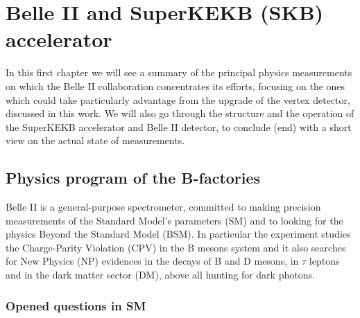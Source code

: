 
\chapter{Belle II and SuperKEKB (SKB) accelerator}

\begin{comment}
In this first chapter we will see a summary of the principal physics measurements conducted (?? taken) by Belle II experiment, focusing on the ones which could take particularly advantage from the upgrade of the vertex detector, discussed in this work. We will also go through the structure and the operation of the SuperKEKB accelerator and Belle II detector, to conclude (end) with a short view on the actual state of measurements.
\end{comment}

In this first chapter we will see a summary of the principal physics measurements on which the Belle II collaboration concentrates its efforts, focusing on the ones which could take particularly advantage from the upgrade of the vertex detector, discussed in this work. We will also go through the structure and the operation of the SuperKEKB accelerator and Belle II detector, to conclude (end) with a short view on the actual state of measurements.




\section{Physics program of the B-factories}



Belle II is a general-purpose spectrometer, committed to making precision measurements of the Standard Model's parameters (SM) and to looking for the physics Beyond the Standard Model (BSM).
In particular the experiment studies the Charge-Parity Violation (CPV) in the B mesons system and it also searches for New Physics (NP) evidences in the decays of B and D mesons, in $\tau$ leptons and in the dark matter sector (DM), above all hunting for dark photons.

\subsection{Opened questions in SM}

